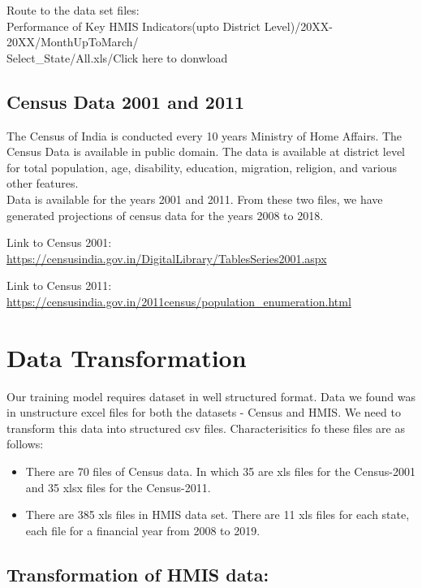\documentclass[12pt]{article}
\begin{document}
\medskip
Route to the data set files:\\
Performance of Key HMIS Indicators(upto District Level)/20XX-20XX/MonthUpToMarch/\\
Select\_State/All.xls/Click here to donwload 


\subsection{Census Data 2001 and 2011}

The Census of India is conducted every 10 years Ministry of Home Affairs. The Census Data is available in public domain. The data is available at district level for total population, age, disability, education, migration, religion, and various other features.\\

Data is available for the years 2001 and 2011. From these two files, we have generated projections of census data for the years 2008 to 2018. 

\medskip

Link to Census 2001:\\ \url{https://censusindia.gov.in/DigitalLibrary/TablesSeries2001.aspx}

\medskip

Link to Census 2011:\\ \url{https://censusindia.gov.in/2011census/population_enumeration.html}

\newpage
\section{Data Transformation}
Our training model requires dataset in well structured format. Data we found was in unstructure excel files for both the datasets - Census and HMIS. We need to transform this data into structured csv files. Characterisitics fo these files are as follows:\\
\begin{itemize}
	\item There are 70 files of Census data. In which 35 are xls files for the Census-2001 and 35 xlsx files for the Census-2011.
	\item There are 385 xls files in HMIS data set. There are 11 xls files for each state, each file for a financial year from 2008 to 2019.
\end{itemize}

\subsection{Transformation of HMIS data:}
\end{document}
